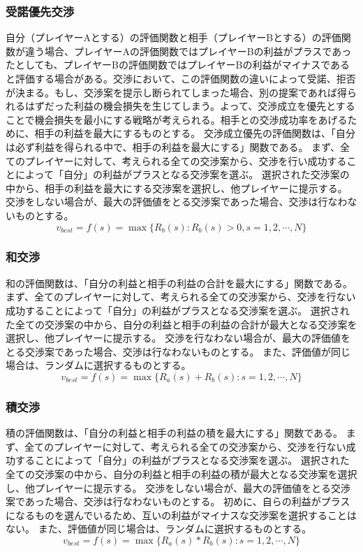 \documentclass[a4, 10pt,dvipdfmx]{jsarticle}
\begin{document}
\subsubsection*{受諾優先交渉}
自分（プレイヤーAとする）の評価関数と相手（プレイヤーBとする）の評価関数が違う場合、プレイヤーAの評価関数ではプレイヤーBの利益がプラスであったとしても、プレイヤーBの評価関数ではプレイヤーBの利益がマイナスであると評価する場合がある。交渉において、この評価関数の違いによって受諾、拒否が決まる。もし、交渉案を提示し断られてしまった場合、別の提案であれば得られるはずだった利益の機会損失を生じてしまう。よって、交渉成立を優先とすることで機会損失を最小にする戦略が考えられる。相手との交渉成功率をあげるために、相手の利益を最大にするものとする。
交渉成立優先の評価関数は、「自分は必ず利益を得られる中で、相手の利益を最大にする」関数である。
まず、全てのプレイヤーに対して、考えられる全ての交渉案から、交渉を行い成功することによって「自分」の利益がプラスとなる交渉案を選ぶ。
選択された交渉案の中から、相手の利益を最大にする交渉案を選択し、他プレイヤーに提示する。
交渉をしない場合が、最大の評価値をとる交渉案であった場合、交渉は行なわないものとする。
\begin{equation}
  v_{best} = f(s) = \max \{ R_{b}(s)  :   R_{b}(s) > 0, s = 1, 2, \cdots, N \}
\end{equation}

\subsubsection*{和交渉}
和の評価関数は、「自分の利益と相手の利益の合計を最大にする」関数である。
まず、全てのプレイヤーに対して、考えられる全ての交渉案から、交渉を行ない成功することによって「自分」の利益がプラスとなる交渉案を選ぶ。
選択された全ての交渉案の中から、自分の利益と相手の利益の合計が最大となる交渉案を選択し、他プレイヤーに提示する。
交渉を行なわない場合が、最大の評価値をとる交渉案であった場合、交渉は行なわないものとする。
また、評価値が同じ場合は、ランダムに選択するものとする。
\begin{equation}
  v_{best} = f(s) = \max \{ R_{a}(s) +  R_{b}(s) : s = 1, 2, \cdots, N \}
\end{equation}

\subsubsection*{積交渉}
積の評価関数は、「自分の利益と相手の利益の積を最大にする」関数である。
まず、全てのプレイヤーに対して、考えられる全ての交渉案から、交渉を行ない成功することによって「自分」の利益がプラスとなる交渉案を選ぶ。
選択された全ての交渉案の中から、自分の利益と相手の利益の積が最大となる交渉案を選択し、他プレイヤーに提示する。
交渉をしない場合が、最大の評価値をとる交渉案であった場合、交渉は行なわないものとする。
初めに、自らの利益がプラスになるものを選んでいるため、互いの利益がマイナスな交渉案を選択することはない。
また、評価値が同じ場合は、ランダムに選択するものとする。
\begin{equation}
  v_{best} = f(s) = \max \{ R_{a}(s) * R_{b}(s) : s = 1, 2, \cdots, N \}
\end{equation}
\end{document}
